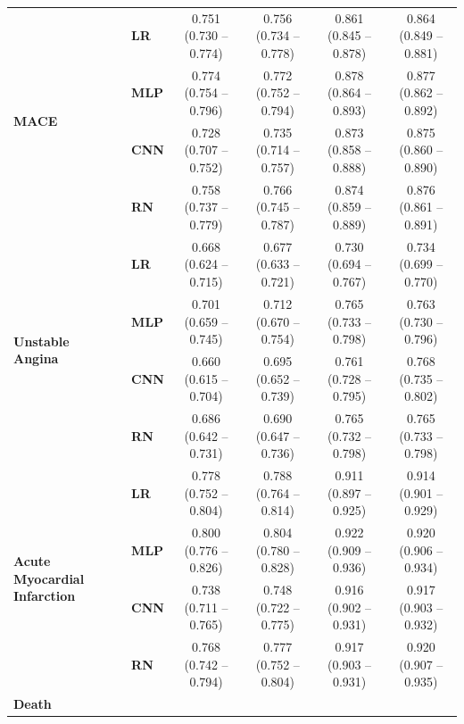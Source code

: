 \documentclass[preprint]{elsarticle}
\begin{document}
\begin{table}[H]
\begin{adjustbox}{center}
\begin{tabular}{@{}llcccc@{}}
\multirow{4}{*}{\begin{minipage}{0.65in}\textbf{MACE}\end{minipage}} %
& \textbf{LR} & 0.751 (0.730 -- 0.774) & 0.756 (0.734 -- 0.778) & 0.861 (0.845 -- 0.878) & 0.864 (0.849 -- 0.881) \\
& \textbf{MLP} & 0.774 (0.754 -- 0.796) & 0.772 (0.752 -- 0.794) & 0.878 (0.864 -- 0.893) & 0.877 (0.862 -- 0.892) \\
& \textbf{CNN} & 0.728 (0.707 -- 0.752) & 0.735 (0.714 -- 0.757) & 0.873 (0.858 -- 0.888) & 0.875 (0.860 -- 0.890) \\
& \textbf{RN} & 0.758 (0.737 -- 0.779) & 0.766 (0.745 -- 0.787) & 0.874 (0.859 -- 0.889) & 0.876 (0.861 -- 0.891) \\
  \cmidrule(lr){1-2}
\multirow{4}{*}{\begin{minipage}{0.65in}\textbf{Unstable Angina}\end{minipage}} %
& \textbf{LR} & 0.668 (0.624 -- 0.715) & 0.677 (0.633 -- 0.721) & 0.730 (0.694 -- 0.767) & 0.734 (0.699 -- 0.770) \\
& \textbf{MLP} & 0.701 (0.659 -- 0.745) & 0.712 (0.670 -- 0.754) & 0.765 (0.733 -- 0.798) & 0.763 (0.730 -- 0.796) \\
& \textbf{CNN} & 0.660 (0.615 -- 0.704) & 0.695 (0.652 -- 0.739) & 0.761 (0.728 -- 0.795) & 0.768 (0.735 -- 0.802) \\
& \textbf{RN} & 0.686 (0.642 -- 0.731) & 0.690 (0.647 -- 0.736) & 0.765 (0.732 -- 0.798) & 0.765 (0.733 -- 0.798) \\
  \cmidrule(lr){1-2}
\multirow{4}{*}{\begin{minipage}{0.65in}\textbf{Acute \linebreak Myocardial \linebreak Infarction}\end{minipage}} %
& \textbf{LR} & 0.778 (0.752 -- 0.804) & 0.788 (0.764 -- 0.814) & 0.911 (0.897 -- 0.925) & 0.914 (0.901 -- 0.929) \\
& \textbf{MLP} & 0.800 (0.776 -- 0.826) & 0.804 (0.780 -- 0.828) & 0.922 (0.909 -- 0.936) & 0.920 (0.906 -- 0.934) \\
& \textbf{CNN} & 0.738 (0.711 -- 0.765) & 0.748 (0.722 -- 0.775) & 0.916 (0.902 -- 0.931) & 0.917 (0.903 -- 0.932) \\
& \textbf{RN} & 0.768 (0.742 -- 0.794) & 0.777 (0.752 -- 0.804) & 0.917 (0.903 -- 0.931) & 0.920 (0.907 -- 0.935) \\
  \cmidrule(lr){1-2}
\multirow{4}{*}{\begin{minipage}{0.65in}\textbf{Death}\end{minipage}} %

\end{tabular}
\end{adjustbox}
\end{table}
\end{document}
